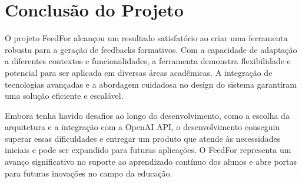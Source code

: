 \section{Conclusão do Projeto}

O projeto FeedFor alcançou um resultado satisfatório ao criar uma ferramenta robusta para a geração de feedbacks formativos. Com a capacidade de adaptação a diferentes contextos e funcionalidades, a ferramenta demonstra flexibilidade e potencial para ser aplicada em diversas áreas acadêmicas. A integração de tecnologias avançadas e a abordagem cuidadosa no design do sistema garantiram uma solução eficiente e escalável.

Embora tenha havido desafios ao longo do desenvolvimento, como a escolha da arquitetura e a integração com a OpenAI API, o desenvolvimento conseguiu superar essas dificuldades e entregar um produto que atende às necessidades iniciais e pode ser expandido para futuras aplicações. O FeedFor representa um avanço significativo no suporte ao aprendizado contínuo dos alunos e abre portas para futuras inovações no campo da educação.
